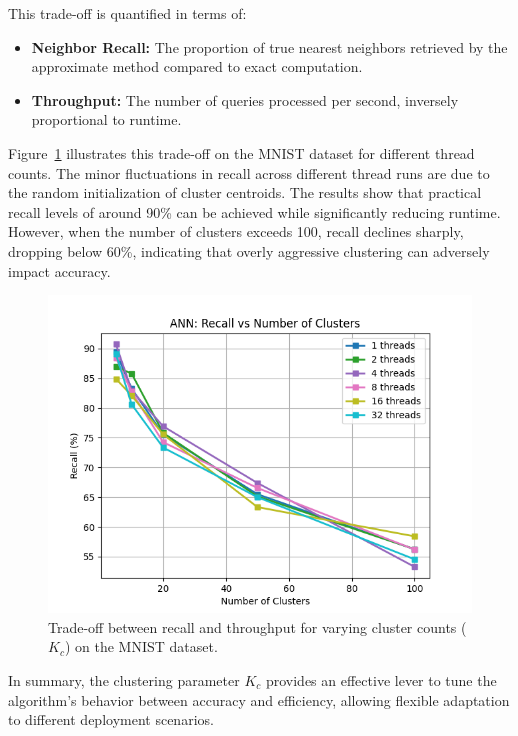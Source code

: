 \documentclass[conference]{IEEEtran}
\begin{document}
This trade-off is quantified in terms of:
\begin{itemize}
    \item \textbf{Neighbor Recall:} The proportion of true nearest neighbors retrieved by the approximate method compared to exact computation.
    \item \textbf{Throughput:} The number of queries processed per second, inversely proportional to runtime.
\end{itemize}

Figure~\ref{fig:ann_recall_vs_clusters} illustrates this trade-off on the MNIST dataset for different thread 
counts. The minor fluctuations in recall across different thread runs are due to the random initialization of 
cluster centroids. The results show that practical recall levels of around 90\% can be achieved while significantly 
reducing runtime. However, when the number of clusters exceeds 100, recall declines sharply, dropping below 60\%,
indicating that overly aggressive clustering can adversely impact accuracy.

\begin{figure}
    \centering
    \includegraphics[width=1\linewidth]{figures/ann_recall_vs_clusters.png}
    \caption{Trade-off between recall and throughput for varying cluster counts ($K_c$) on the MNIST dataset.}
    \label{fig:ann_recall_vs_clusters}
\end{figure}

In summary, the clustering parameter $K_c$ provides an effective lever to tune the algorithm's behavior 
between accuracy and efficiency, allowing flexible adaptation to different deployment scenarios.
\end{document}
